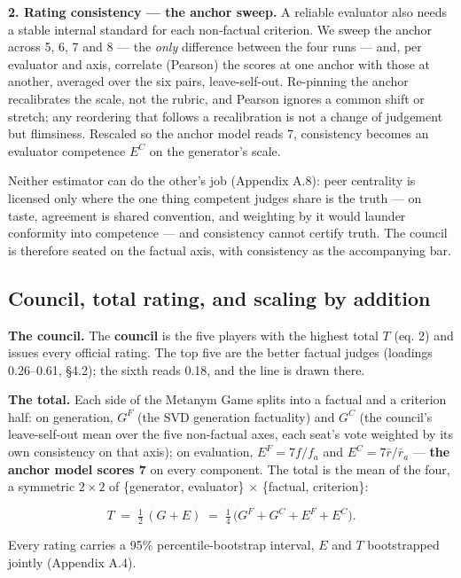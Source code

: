 \documentclass{article}
\begin{document}
\textbf{2. Rating consistency --- the anchor sweep.} A reliable evaluator also needs a stable internal standard for each non-factual criterion. We sweep the anchor across 5, 6, 7 and 8 --- the \emph{only} difference between the four runs --- and, per evaluator and axis, correlate (Pearson) the scores at one anchor with those at another, averaged over the six pairs, leave-self-out. Re-pinning the anchor recalibrates the scale, not the rubric, and Pearson ignores a common shift or stretch; any reordering that follows a recalibration is not a change of judgement but flimsiness. Rescaled so the anchor model reads 7, consistency becomes an evaluator competence \(E^{C}\) on the generator's scale.

Neither estimator can do the other's job (Appendix A.8): peer centrality is licensed only where the one thing competent judges share is the truth --- on taste, agreement is shared convention, and weighting by it would launder conformity into competence --- and consistency cannot certify truth. The council is therefore seated on the factual axis, with consistency as the accompanying bar.

\subsection{Council, total rating, and scaling by addition}\label{council-total-rating-and-scaling-by-addition}

\textbf{The council.} The \textbf{council} is the five players with the highest total \(T\) (eq. 2) and issues every official rating. The top five are the better factual judges (loadings 0.26--0.61, \S{}4.2); the sixth reads 0.18, and the line is drawn there.

\textbf{The total.} Each side of the Metanym Game splits into a factual and a criterion half: on generation, \(G^{F}\) (the SVD generation factuality) and \(G^{C}\) (the council's leave-self-out mean over the five non-factual axes, each seat's vote weighted by its own consistency on that axis); on evaluation, \(E^{F} = 7f/f_a\) and \(E^{C} = 7\bar r/\bar r_a\) --- \textbf{the anchor model scores 7} on every component. The total is the mean of the four, a symmetric \(2\times2\) of \{generator, evaluator\} \ensuremath{\times} \{factual, criterion\}:

\[T \;=\; \tfrac12\,(G+E) \;=\; \tfrac14\,\big(G^{F}+G^{C}+E^{F}+E^{C}\big). \tag{2}\]

Every rating carries a 95\% percentile-bootstrap interval, \(E\) and \(T\) bootstrapped jointly (Appendix A.4).
\end{document}
